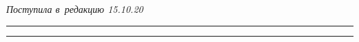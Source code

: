 




\vspace*{-6pt}





\hfill{\small\textit{Поступила в~редакцию 15.10.20}}





\vspace*{8pt}




















\hrule





\vspace*{2pt}





\hrule










\def\tit{STATIONARY CHARACTERISTICS\\ 


OF~DISCRETE-TIME~Geo$/G/1/\infty$ QUEUE\\ 


WITH~BATCH ARRIVALS AND~ONE QUEUE SKIPPING POLICY}








\def\titkol{Stationary characteristics of discrete-time Geo$/G/1/\infty$ 


queue with~batch arrivals and~one queue skipping policy}








\def\aut{S.\,I.~Matyushenko$^1$ and R.\,V.~Razumchik$^2$}





